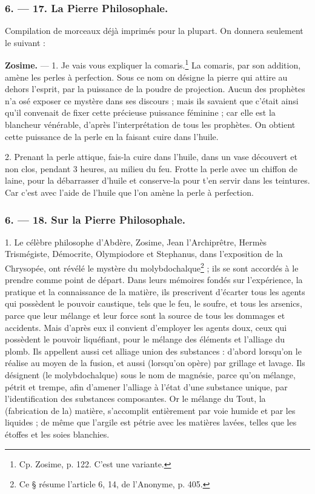 \documentclass[a4paper, 11pt, oneside, polutonikogreek, french]{article}
\begin{document}
\bigskip
\centerline{\EightStarTaper}
\centerline{\EightStarTaper\EightStarTaper}
\bigskip

\subsubsection{6. --- 17. La Pierre Philosophale.}

Compilation de morceaux déjà imprimés pour la plupart. On donnera seulement le suivant :

\textbf{Zosime.} --- 1. Je vais vous expliquer la comaris.\footnote{Cp. Zosime, p. 122. C'est une variante.} La comaris, par son addition, amène les perles à perfection. Sous ce nom on désigne la pierre qui attire au dehors l'esprit, par la puissance de la poudre de projection. Aucun des prophètes n'a osé exposer ce mystère dans ses discours ; mais ils savaient que c'était ainsi qu'il convenait de fixer cette précieuse puissance féminine ; car elle est la blancheur vénérable, d'après l'interprétation de tous les prophètes. On obtient cette puissance de la perle en la faisant cuire dans l'huile.

2. Prenant la perle attique, fais-la cuire dans l'huile, dans un vase découvert et non clos, pendant 3 heures, au milieu du feu. Frotte la perle avec un chiffon de laine, pour la débarrasser d'huile et conserve-la pour t'en servir dans les teintures. Car c'est avec l'aide de l'huile que l'on amène la perle à perfection.

\bigskip
\centerline{\EightStarTaper}
\centerline{\EightStarTaper\EightStarTaper}
\bigskip

\subsubsection{6. --- 18. Sur la Pierre Philosophale.}

1. Le célèbre philosophe d'Abdère, Zosime, Jean l'Archiprêtre, Hermès Trismégiste, Démocrite, Olympiodore et Stephanus, dans l'exposition de la Chrysopée, ont révélé le mystère du molybdochalque\footnote{Ce § résume l'article 6, 14, de l'Anonyme, p. 405.} ; ils se sont accordés à le prendre comme point de départ. Dans leurs mémoires fondés sur l'expérience, la pratique et la connaissance de la matière, ils prescrivent d'écarter tous les agents qui possèdent le pouvoir caustique, tels que le feu, le soufre, et tous les arsenics, parce que leur mélange et leur force sont la source de tous les dommages et accidents. Mais d'après eux il convient d'employer les agents doux, ceux qui possèdent le pouvoir liquéfiant, pour le mélange des éléments et l'alliage du plomb. Ils appellent aussi cet alliage union des substances : d'abord lorsqu'on le réalise au moyen de la fusion, et aussi (lorsqu'on opère) par grillage et lavage. Ils désignent (le molybdochalque) sous le nom de magnésie, parce qu'on mélange, pétrit et trempe, afin d'amener l'alliage à l'état d'une substance unique, par l'identification des substances composantes. Or le mélange du Tout, la (fabrication de la) matière, s'accomplit entièrement par voie humide et par les liquides ; de même que l'argile est pétrie avec les matières lavées, telles que les étoffes et les soies blanchies.
\end{document}
